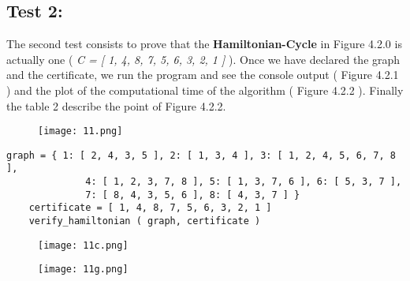 \subsection{Test 2:}

The second test consists to prove that the {\bfseries Hamiltonian-Cycle} in Figure 4.2.0 is actually one ( {\itshape C = [ 1, 4, 8, 7, 5, 6, 3, 2, 1 ]} ). Once we have declared the graph and the certificate, we run the program and see the console output ( Figure 4.2.1 ) and the plot of the computational time of the algorithm ( Figure 4.2.2 ). Finally the table 2 describe the point of Figure 4.2.2. \hfill \break

\begin{figure}[H]
\texttt{[image: 11.png]}
\centering \linebreak {}
\end{figure} \hfill \break

\begin{lstlisting}
graph = { 1: [ 2, 4, 3, 5 ], 2: [ 1, 3, 4 ], 3: [ 1, 2, 4, 5, 6, 7, 8 ],
              4: [ 1, 2, 3, 7, 8 ], 5: [ 1, 3, 7, 6 ], 6: [ 5, 3, 7 ],
              7: [ 8, 4, 3, 5, 6 ], 8: [ 4, 3, 7 ] }
    certificate = [ 1, 4, 8, 7, 5, 6, 3, 2, 1 ]
    verify_hamiltonian ( graph, certificate )
\end{lstlisting} \hfill \break

\begin{figure}[H]
\texttt{[image: 11c.png]}
\centering \linebreak {}
\end{figure} \hfill \break

\begin{figure}[H]
\texttt{[image: 11g.png]}
\centering \linebreak {}
\end{figure} \hfill \break

